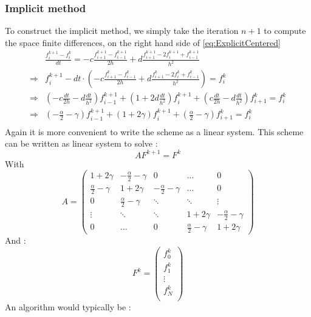 \documentclass[11pt,a4paper]{article}
\begin{document}
\subsubsection{Implicit method}
To construct the implicit method, we simply take the iteration $n+1$ to compute the space finite differences, on the right hand side of \ref{eq:ExplicitCentered} 
\begin{align}\label{eq:ExplicitCentered}
&\frac{f_i^{k+1} - f_i^{k}}{dt} = - c \frac{f_{i+1}^{k+1} - f_{i-1}^{k+1}}{2h} 
								 + d \frac{f_{i+1}^{k+1} - 2 f_{i}^{k+1} + f_{i-1}^{k+1}}{h^{2}} \\
\Rightarrow & f_i^{k+1} - dt \cdot (- c \frac{f_{i+1}^{k} - f_{i-1}^{k}}{2h} 
						+ d \frac{f_{i+1}^{k} - 2 f_{i}^{k} + f_{i-1}^{k}}{h^{2}} ) 
						= f_i^{k}   \\
\Rightarrow &   \left( -c \frac{dt}{2h} - d \frac{dt}{h^2} \right) f_{i-1}^{k+1} 
							+ \left(1 + 2 d \frac{dt}{h^2} \right) f_{i}^{k+1} 
							+ \left( c \frac{dt}{2h} - d \frac{dt}{h^2} \right) f_{i+1}^{k}
							= f_i^{k}   \\
\Rightarrow & \left( -\frac{\alpha}{2} - \gamma \right) f_{i-1}^{k+1} 
							+ \left(1 + 2 \gamma \right) f_{i}^{k+1} 
							+ \left( \frac{\alpha}{2} - \gamma \right) f_{i+1}^{k}
							= f_i^{k}   \\
\end{align}
Again it is more convenient to write the scheme as a linear system.
This scheme can be written as linear system to solve : 
\[ A F^{k+1} = F^k\]
With \[
A = \begin{pmatrix}
      1+2\gamma & -\frac{\alpha}{2} - \gamma & 0   & \dots     & 0   \\
      \frac{\alpha}{2} -  \gamma & 1+2\gamma       & -\frac{\alpha}{2} - \gamma   & \dots     & 0 \\
      0&         \frac{\alpha}{2} -  \gamma& \ddots         & \ddots    & \vdots    \\
      \vdots&         \ddots&           \ddots &     1+2\gamma      & -\frac{\alpha}{2} - \gamma  \\
      0&         \dots&           0&          \frac{\alpha}{2} -  \gamma & 1+2\gamma
  \end{pmatrix}
\]
And : \[
F^k =  \begin{pmatrix}
f_0^k \\
f_1^k \\
\vdots \\
f_N^k \\
\end{pmatrix}
\]
An algorithm would typically be : 
\end{document}
